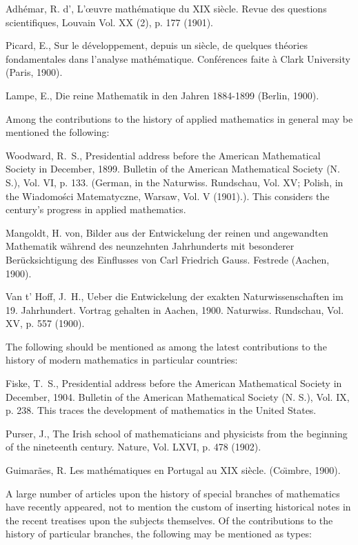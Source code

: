 \documentclass[oneside]{book}
\begin{document}
Adh\'emar, R. d', L'\oe{}uvre math\'ematique du XIX si\`ecle. Revue
des questions scientifiques, Louvain Vol. XX (2), p. 177 (1901).

Picard, E., Sur le d\'eveloppement, depuis un si\`ecle, de quelques
th\'eories fondamentales dans l'analyse
math\'ematique. Conf\'erences faite \`a Clark University (Paris,
1900).

Lampe, E., Die reine Mathematik in den Jahren 1884-1899 (Berlin,
1900).

\bigskip

Among the contributions to the history of applied mathematics in
general may be mentioned the following:

\bigskip

Woodward, R.~S., Presidential address before the American
Mathematical Society in December, 1899. Bulletin of the American
Mathematical Society (N. S.), Vol. VI, p. 133. (German, in the
Naturwiss. Rundschau, Vol. XV; Polish, in the Wiadomo\'sci
Matematyczne, Warsaw, Vol. V (1901).). This considers the century's
progress in applied mathematics.

Mangoldt, H. von, Bilder aus der Entwickelung der reinen und
angewandten Mathematik w\"ahrend des neunzehnten Jahrhunderts mit
besonderer Ber\"ucksichtigung des Einflusses von Carl Friedrich
Gauss. Festrede (Aachen, 1900).

Van t' Hoff, J.~H., Ueber die Entwickelung der exakten
Naturwissenschaften im 19. Jahrhundert. Vortrag gehalten in Aachen,
1900. Naturwiss. Rundschau, Vol. XV, p. 557 (1900).

\bigskip

The following should be mentioned as among the latest contributions
to the history of modern mathematics in particular countries:

\bigskip

Fiske, T.~S., Presidential address before the American Mathematical
Society in December, 1904. Bulletin of the American Mathematical
Society (N. S.), Vol. IX, p. 238. This traces the development of
mathematics in the United States.

Purser, J., The Irish school of mathematicians and physicists from
the beginning of the nineteenth century. Nature, Vol. LXVI, p. 478
(1902).

Guimar\~aes, R. Les math\'ematiques en Portugal au XIX si\`ecle.
(Co\"{\i}mbre, 1900).

\bigskip

A large number of articles upon the history of special branches of
mathematics have recently appeared, not to mention the custom of
inserting historical notes in the recent treatises upon the subjects
themselves. Of the contributions to the history of particular
branches, the following may be mentioned as types:
\end{document}
